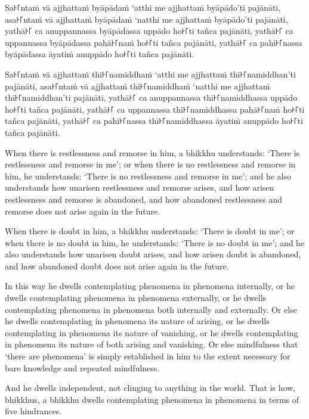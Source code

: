 Sa꜔꜒ntaṁ vā ajjhattaṁ byāpādaṁ ‘atthi me ajjhattaṁ byāpādo’ti pajānāti,
asa꜔꜒ntaṁ vā ajjhattaṁ byāpādaṁ ‘natthi me ajjhattaṁ byāpādo’ti pajānāti,
yathā꜔꜒ ca anuppannassa byāpādassa uppādo ho꜔꜒ti tañca pajānāti,
yathā꜔꜒ ca uppannassa byāpādassa pahā꜔꜒naṁ ho꜔꜒ti tañca pajānāti,
yathā꜔꜒ ca pahī꜔꜒nassa byāpādassa āyatiṁ anuppādo ho꜔꜒ti tañca pajānāti.

\enlargethispage{\baselineskip}

Sa꜔꜒ntaṁ vā ajjhattaṁ thī꜔꜒namiddhaṁ ‘atthi me ajjhattaṁ thī꜔꜒namiddhan’ti pajānāti,
asa꜔꜒ntaṁ vā ajjhattaṁ thī꜔꜒namiddhaṁ ‘natthi me ajjhattaṁ thī꜔꜒namiddhan’ti pajānāti,
yathā꜔꜒ ca anuppannassa thī꜔꜒namiddhassa uppādo ho꜔꜒ti tañca pajānāti,
yathā꜔꜒ ca uppannassa thī꜔꜒namiddhassa pahā꜔꜒naṁ ho꜔꜒ti tañca pajānāti,
yathā꜔꜒ ca pahī꜔꜒nassa thī꜔꜒namiddhassa āyatiṁ anuppādo ho꜔꜒ti tañca pajānāti.

\englishPage

When there is restlessness and remorse in him, a bhikkhu understands:
`There is restlessness and remorse in me';
or when there is no restlessness and remorse in him, he understands:
`There is no restlessness and remorse in me';
and he also understands how unarisen restlessness and remorse arises,
and how arisen restlessness and remorse is abandoned,
and how abandoned restlessness and remorse does not arise again in the future.

When there is doubt in him, a bhikkhu understands:
`There is doubt in me';
or when there is no doubt in him, he understands:
`There is no doubt in me';
and he also understands how unarisen doubt arises,
and how arisen doubt is abandoned,
and how abandoned doubt does not arise again in the future.

In this way he dwells contemplating phenomena in phenomena internally, or he
dwells contemplating phenomena in phenomena externally, or he dwells
contemplating phenomena in phenomena both internally and externally. Or else he
dwells contemplating in phenomena its nature of arising, or he dwells
contemplating in phenomena its nature of vanishing, or he dwells contemplating
in phenomena its nature of both arising and vanishing. Or else mindfulness that
‘there are phenomena’ is simply established in him to the extent necessary for
bare knowledge and repeated mindfulness.

And he dwells independent, not clinging to anything in the world. That is how,
bhikkhus, a bhikkhu dwells contemplating phenomena in phenomena in terms of five
hindrances.


